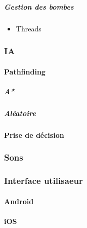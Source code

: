 			\subparagraph{Gestion des bombes}
				\begin{itemize}
					\item{Threads}
				\end{itemize}
	
	\subsubsection{IA}
	
		\hypertarget{IA}{}
		\label{IA}
		
		\paragraph{Pathfinding}
			\subparagraph{A*}
			\subparagraph{Aléatoire}
			\paragraph{Prise de décision}
			

	\subsubsection{Sons}
	
		\hypertarget{Sons}{}
		\label{Sons}
	
	\subsubsection{Interface utilisaeur}
		\paragraph{Android}
		\paragraph{iOS}
